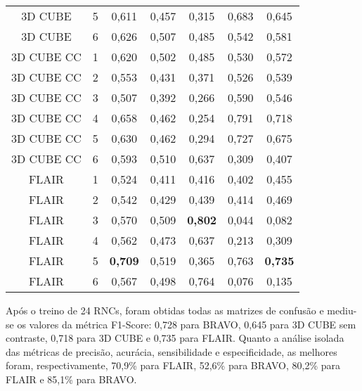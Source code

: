 \begin{table}[!htb]
\begin{tabular}{ccccccc}
3D CUBE    & 5 & 0,611          & 0,457          & 0,315          & 0,683          & 0,645          \\
3D CUBE    & 6 & 0,626          & 0,507          & 0,485          & 0,542          & 0,581          \\
3D CUBE CC & 1 & 0,620          & 0,502          & 0,485          & 0,530          & 0,572          \\
3D CUBE CC & 2 & 0,553          & 0,431          & 0,371          & 0,526          & 0,539          \\
3D CUBE CC & 3 & 0,507          & 0,392          & 0,266          & 0,590          & 0,546          \\
3D CUBE CC & 4 & 0,658          & 0,462          & 0,254          & 0,791          & 0,718          \\
3D CUBE CC & 5 & 0,630          & 0,462          & 0,294          & 0,727          & 0,675          \\
3D CUBE CC & 6 & 0,593          & 0,510          & 0,637          & 0,309          & 0,407          \\
FLAIR      & 1 & 0,524          & 0,411          & 0,416          & 0,402          & 0,455          \\
FLAIR      & 2 & 0,542          & 0,429          & 0,439          & 0,414          & 0,469          \\
FLAIR      & 3 & 0,570          & 0,509          & \textbf{0,802} & 0,044          & 0,082          \\
FLAIR      & 4 & 0,562          & 0,473          & 0,637          & 0,213          & 0,309          \\
FLAIR      & 5 & \textbf{0,709} & 0,519          & 0,365          & 0,763          & \textbf{0,735} \\
FLAIR      & 6 & 0,567          & 0,498          & 0,764          & 0,076          & 0,135          \\ \hline
\end{tabular}
\label{tab:treinos_ponderacoes}
\end{table}

Após o treino de 24 RNCs, foram obtidas todas as matrizes de confusão e mediu-se os valores da métrica F1-Score: 0,728 para BRAVO, 0,645 para 3D CUBE sem contraste, 0,718 para 3D CUBE e 0,735 para FLAIR. Quanto a análise isolada das métricas de precisão, acurácia, sensibilidade e especificidade, as melhores foram, respectivamente, 70,9\% para FLAIR, 52,6\% para BRAVO, 80,2\% para FLAIR e 85,1\% para BRAVO. 

